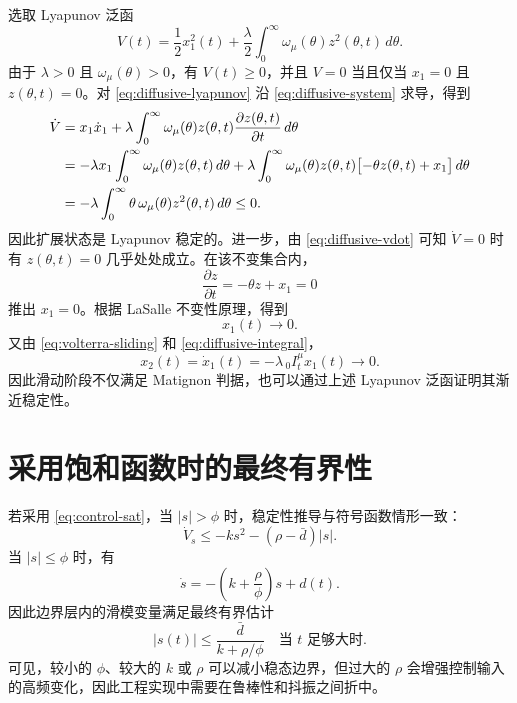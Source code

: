 \documentclass[UTF8,a4paper,11pt]{ctexart}
\begin{document}
选取 Lyapunov 泛函
\begin{equation}
  V(t)
  =
  \frac{1}{2}x_1^2(t)
  +
  \frac{\lambda}{2}
  \int_0^\infty
  \omega_\mu(\theta)z^2(\theta,t)\,d\theta.
  \label{eq:diffusive-lyapunov}
\end{equation}
由于 $\lambda>0$ 且 $\omega_\mu(\theta)>0$，有 $V(t)\ge 0$，并且
$V=0$ 当且仅当 $x_1=0$ 且 $z(\theta,t)=0$。对
\eqref{eq:diffusive-lyapunov} 沿 \eqref{eq:diffusive-system} 求导，得到
\begin{align}
  \dot V
  &=
  x_1\dot{x}_1
  +
  \lambda
  \int_0^\infty
  \omega_\mu(\theta)z(\theta,t)
  \frac{\partial z(\theta,t)}{\partial t}\,d\theta
  \notag\\
  &=
  -\lambda x_1
  \int_0^\infty \omega_\mu(\theta)z(\theta,t)\,d\theta
  +
  \lambda
  \int_0^\infty
  \omega_\mu(\theta)z(\theta,t)
  \bigl[-\theta z(\theta,t)+x_1\bigr]\,d\theta
  \notag\\
  &=
  -\lambda
  \int_0^\infty
  \theta\,\omega_\mu(\theta)z^2(\theta,t)\,d\theta
  \le 0.
  \label{eq:diffusive-vdot}
\end{align}
因此扩展状态是 Lyapunov 稳定的。进一步，由
\eqref{eq:diffusive-vdot} 可知 $\dot V=0$ 时有
$z(\theta,t)=0$ 几乎处处成立。在该不变集合内，
\[
  \frac{\partial z}{\partial t}
  =
  -\theta z+x_1=0
\]
推出 $x_1=0$。根据 LaSalle 不变性原理，得到
\begin{equation}
  x_1(t)\to 0.
\end{equation}
又由 \eqref{eq:volterra-sliding} 和 \eqref{eq:diffusive-integral}，
\begin{equation}
  x_2(t)=\dot{x}_1(t)
  =
  -\lambda\,{}_0 I_t^\mu x_1(t)
  \to 0.
\end{equation}
因此滑动阶段不仅满足 Matignon 判据，也可以通过上述
Lyapunov 泛函证明其渐近稳定性。

\section{采用饱和函数时的最终有界性}

若采用 \eqref{eq:control-sat}，当 $|s|>\phi$ 时，稳定性推导与符号函数情形一致：
\begin{equation}
  \dot V_s\le -k s^2-(\rho-\bar d)|s|.
\end{equation}
当 $|s|\le \phi$ 时，有
\begin{equation}
  \dot{s}
  =
  -\left(k+\frac{\rho}{\phi}\right)s+d(t).
\end{equation}
因此边界层内的滑模变量满足最终有界估计
\begin{equation}
  |s(t)|
  \le
  \frac{\bar d}{k+\rho/\phi}
  \quad \text{当 } t \text{ 足够大时}.
\end{equation}
可见，较小的 $\phi$、较大的 $k$ 或 $\rho$ 可以减小稳态边界，但过大的 $\rho$ 会增强控制输入的高频变化，因此工程实现中需要在鲁棒性和抖振之间折中。
\end{document}
